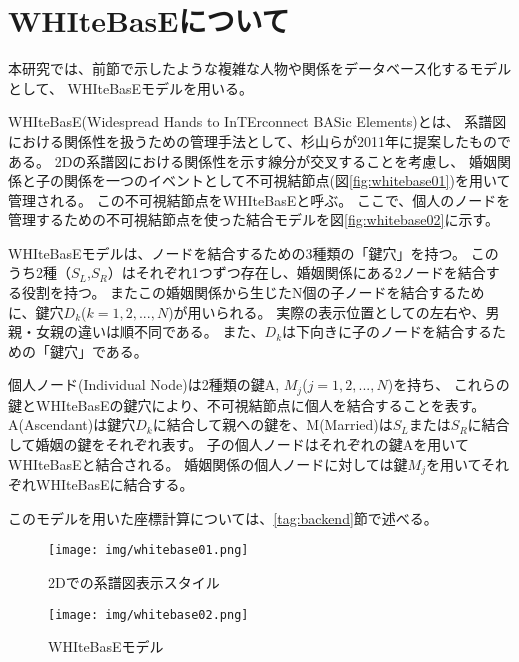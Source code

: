 \section{WHIteBasEについて}
\label{tag:wb}

本研究では、前節で示したような複雑な人物や関係をデータベース化するモデルとして、
WHIteBasEモデル\cite{white}を用いる。

WHIteBasE(Widespread Hands to InTErconnect BASic Elements)とは、
系譜図における関係性を扱うための管理手法として、杉山らが2011年に提案したものである\cite{white}。
2Dの系譜図における関係性を示す線分が交叉することを考慮し、
婚姻関係と子の関係を一つのイベントとして不可視結節点(図\ref{fig:whitebase01})を用いて管理される。
この不可視結節点をWHIteBasEと呼ぶ。
ここで、個人のノードを管理するための不可視結節点を使った結合モデルを図\ref{fig:whitebase02}に示す。

WHIteBasEモデルは、ノードを結合するための3種類の「鍵穴」を持つ。
このうち2種（$S_L$,$S_R$）はそれぞれ1つずつ存在し、婚姻関係にある2ノードを結合する役割を持つ。
またこの婚姻関係から生じたN個の子ノードを結合するために、鍵穴$D_k$($k=1,2,...,N$)が用いられる。
実際の表示位置としての左右や、男親・女親の違いは順不同である。
また、$D_k$は下向きに子のノードを結合するための「鍵穴」である。

個人ノード(Individual Node)は2種類の鍵A, $M_j$($j=1,2,...,N$)を持ち、
これらの鍵とWHIteBasEの鍵穴により、不可視結節点に個人を結合することを表す。
A(Ascendant)は鍵穴$D_k$に結合して親への鍵を、M(Married)は$S_L$または$S_R$に結合して婚姻の鍵をそれぞれ表す。
子の個人ノードはそれぞれの鍵Aを用いてWHIteBasEと結合される。
婚姻関係の個人ノードに対しては鍵$M_j$を用いてそれぞれWHIteBasEに結合する。

このモデルを用いた座標計算については、\ref{tag:backend}節で述べる。

\begin{figure}[htbp]
  \begin{minipage}{0.5\hsize}
    \begin{center}
      \texttt{[image: img/whitebase01.png]}
    \end{center}
    \caption{2Dでの系譜図表示スタイル}
    \label{fig:whitebase01}
  \end{minipage}
  \begin{minipage}{0.5\hsize}
    \begin{center}      
      \texttt{[image: img/whitebase02.png]}
    \end{center}
    \caption{WHIteBasEモデル}
    \label{fig:whitebase02}
  \end{minipage}
  \label{fig:whiltebase00}
\end{figure}